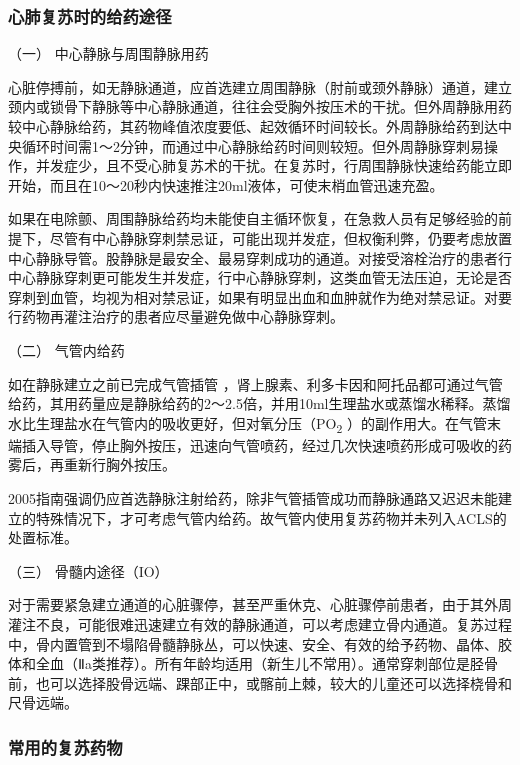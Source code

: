 \subsubsection{心肺复苏时的给药途径}

\hypertarget{text00285.htmlux5cux23CHP10-1-6-1-1}{}
（一） 中心静脉与周围静脉用药

心脏停搏前，如无静脉通道，应首选建立周围静脉（肘前或颈外静脉）通道，建立颈内或锁骨下静脉等中心静脉通道，往往会受胸外按压术的干扰。但外周静脉用药较中心静脉给药，其药物峰值浓度要低、起效循环时间较长。外周静脉给药到达中央循环时间需1～2分钟，而通过中心静脉给药时间则较短。但外周静脉穿刺易操作，并发症少，且不受心肺复苏术的干扰。在复苏时，行周围静脉快速给药能立即开始，而且在10～20秒内快速推注20ml液体，可使末梢血管迅速充盈。

如果在电除颤、周围静脉给药均未能使自主循环恢复，在急救人员有足够经验的前提下，尽管有中心静脉穿刺禁忌证，可能出现并发症，但权衡利弊，仍要考虑放置中心静脉导管。股静脉是最安全、最易穿刺成功的通道。对接受溶栓治疗的患者行中心静脉穿刺更可能发生并发症，行中心静脉穿刺，这类血管无法压迫，无论是否穿刺到血管，均视为相对禁忌证，如果有明显出血和血肿就作为绝对禁忌证。对要行药物再灌注治疗的患者应尽量避免做中心静脉穿刺。

\hypertarget{text00285.htmlux5cux23CHP10-1-6-1-2}{}
（二） 气管内给药

如在静脉建立之前已完成气管插管
，肾上腺素、利多卡因和阿托品都可通过气管给药，其用药量应是静脉给药的2～2.5倍，并用10ml生理盐水或蒸馏水稀释。蒸馏水比生理盐水在气管内的吸收更好，但对氧分压（PO\textsubscript{2}
）的副作用大。在气管末端插入导管，停止胸外按压，迅速向气管喷药，经过几次快速喷药形成可吸收的药雾后，再重新行胸外按压。

2005指南强调仍应首选静脉注射给药，除非气管插管成功而静脉通路又迟迟未能建立的特殊情况下，才可考虑气管内给药。故气管内使用复苏药物并未列入ACLS的处置标准。

\hypertarget{text00285.htmlux5cux23CHP10-1-6-1-3}{}
（三） 骨髓内途径（IO）

对于需要紧急建立通道的心脏骤停，甚至严重休克、心脏骤停前患者，由于其外周灌注不良，可能很难迅速建立有效的静脉通道，可以考虑建立骨内通道。复苏过程中，骨内置管到不塌陷骨髓静脉丛，可以快速、安全、有效的给予药物、晶体、胶体和全血（Ⅱa类推荐）。所有年龄均适用（新生儿不常用）。通常穿刺部位是胫骨前，也可以选择股骨远端、踝部正中，或髂前上棘，较大的儿童还可以选择桡骨和尺骨远端。

\subsubsection{常用的复苏药物}

